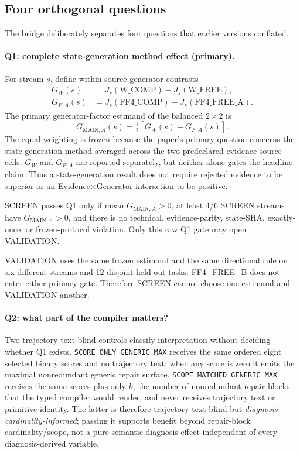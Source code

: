 \subsection{Four orthogonal questions}
The bridge deliberately separates four questions that earlier versions conflated.

\paragraph{Q1: complete state-generation method effect (primary).}
For stream $s$, define within-source generator contrasts
\begin{align}
G_W(s) &= J_s(\text{W\_COMP})-J_s(\text{W\_FREE}),\\
G_{F,A}(s) &= J_s(\text{FF4\_COMP})-J_s(\text{FF4\_FREE\_A}).
\end{align}
The primary generator-factor estimand of the balanced $2\times2$ is
\begin{equation}
G_{\mathrm{MAIN},A}(s)=\tfrac{1}{2}\left[G_W(s)+G_{F,A}(s)\right].
\end{equation}
The equal weighting is frozen because the paper's primary question concerns the state-generation method averaged across the two predeclared evidence-source cells. $G_W$ and $G_{F,A}$ are reported separately, but neither alone gates the headline claim. Thus a state-generation result does not require rejected evidence to be superior or an Evidence$\times$Generator interaction to be positive.

SCREEN passes Q1 only if mean $G_{\mathrm{MAIN},A}>0$, at least 4/6 SCREEN streams have $G_{\mathrm{MAIN},A}>0$, and there is no technical, evidence-parity, state-SHA, exactly-once, or frozen-protocol violation. Only this raw Q1 gate may open VALIDATION.

VALIDATION uses the same frozen estimand and the same directional rule on six different streams and 12 disjoint held-out tasks. FF4\_FREE\_B does not enter either primary gate. Therefore SCREEN cannot choose one estimand and VALIDATION another.

\paragraph{Q2: what part of the compiler matters?}
Two trajectory-text-blind controls classify interpretation without deciding whether Q1 exists. \texttt{SCORE\_ONLY\_GENERIC\_MAX} receives the same ordered eight selected binary scores and no trajectory text; when any score is zero it emits the maximal nonredundant generic repair surface. \texttt{SCOPE\_MATCHED\_GENERIC\_MAX} receives the same scores plus only $k$, the number of nonredundant repair blocks that the typed compiler would render, and never receives trajectory text or primitive identity. The latter is therefore trajectory-text-blind but \emph{diagnosis-cardinality-informed}; passing it supports benefit beyond repair-block cardinality/scope, not a pure semantic-diagnosis effect independent of every diagnosis-derived variable.

